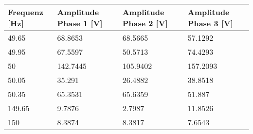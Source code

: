 \begin{appendix}
\newpage
\begin{table}[ht!]
	\centering
	\begin{tabular}{|l|l|l|l|}
		\hline
		Frequenz {[}Hz{]} & Amplitude Phase 1 {[}V{]}                                                           & Amplitude Phase 2 {[}V{]}                                                           & Amplitude Phase 3 {[}V{]}                                                           \\ \hline
		49.65             & 68.8653                                                                             & 68.5665                                                                             & 57.1292                                                                             \\ \hline
		49.95             & 67.5597                                                                             & 50.5713                                                                             & 74.4293                                                                             \\ \hline
		50                & 142.7445                                                                            & 105.9402                                                                            & 157.2093                                                                            \\ \hline
		50.05             & 35.291                                                                              & 26.4882                                                                             & 38.8518                                                                             \\ \hline
		50.35             & 65.3531                                                                             & 65.6359                                                                             & 51.887                                                                              \\ \hline
		149.65            & 9.7876                                                                              & 2.7987                                                                              & 11.8526                                                                             \\ \hline
		150               & 8.3874                                                                              & 8.3817                                                                              & 7.6543                                                                              \\ \hline

\end{tabular}
\end{table}
\end{appendix}
